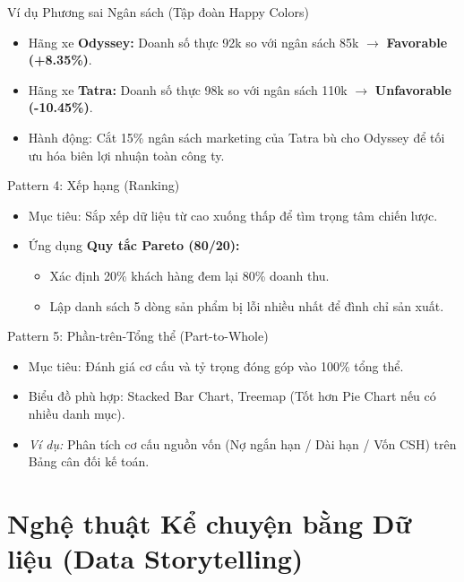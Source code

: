 \documentclass[aspectratio=169,12pt]{beamer}
\begin{document}
\begin{frame}{Ví dụ Phương sai Ngân sách (Tập đoàn Happy Colors)}
    \begin{itemize}
        \item Hãng xe \textbf{Odyssey:} Doanh số thực 92k so với ngân sách 85k $\rightarrow$ \textbf{Favorable (+8.35\%)}.
        \item Hãng xe \textbf{Tatra:} Doanh số thực 98k so với ngân sách 110k $\rightarrow$ \textbf{Unfavorable (-10.45\%)}.
        \item Hành động: Cắt 15\% ngân sách marketing của Tatra bù cho Odyssey để tối ưu hóa biên lợi nhuận toàn công ty.
    \end{itemize}
\end{frame}

\begin{frame}{Pattern 4: Xếp hạng (Ranking)}
    \begin{itemize}
        \item Mục tiêu: Sắp xếp dữ liệu từ cao xuống thấp để tìm trọng tâm chiến lược.
        \item Ứng dụng \textbf{Quy tắc Pareto (80/20):}
        \begin{itemize}
            \item Xác định 20\% khách hàng đem lại 80\% doanh thu.
            \item Lập danh sách 5 dòng sản phẩm bị lỗi nhiều nhất để đình chỉ sản xuất.
        \end{itemize}
    \end{itemize}
\end{frame}

\begin{frame}{Pattern 5: Phần-trên-Tổng thể (Part-to-Whole)}
    \begin{itemize}
        \item Mục tiêu: Đánh giá cơ cấu và tỷ trọng đóng góp vào 100\% tổng thể.
        \item Biểu đồ phù hợp: Stacked Bar Chart, Treemap (Tốt hơn Pie Chart nếu có nhiều danh mục).
        \item \textit{Ví dụ:} Phân tích cơ cấu nguồn vốn (Nợ ngắn hạn / Dài hạn / Vốn CSH) trên Bảng cân đối kế toán.
    \end{itemize}
\end{frame}


\section{Nghệ thuật Kể chuyện bằng Dữ liệu (Data Storytelling)}
\begin{frame}
    \tableofcontents[currentsection]
\end{frame}
\end{document}
